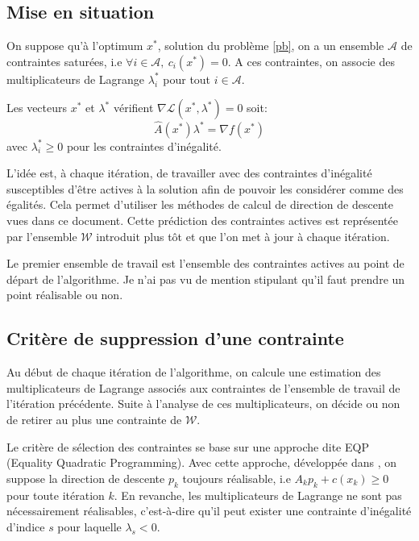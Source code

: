 \documentclass[a4paper,11pt]{article}
\newcommand{\ha}{\hat{A}}
\numberwithin{equation}{section}
\begin{document}
\subsection{Mise en situation}

On suppose qu'à l'optimum $x^{*}$, solution du problème \ref{pb}, on a 
un ensemble $\mathcal{A}$ de contraintes saturées, i.e $\forall i \in \mathcal{A},\ c_{i}(x^{*}) = 0$. A ces contraintes, on associe des multiplicateurs de Lagrange $\lambda^{*}_{i}$ pour tout $i\in \mathcal{A}$. 

Les vecteurs $x^{*}$ et $\lambda^{*}$ vérifient $\nabla \mathcal{L}(x^{*},\lambda^{*}) = 0$ soit:
\begin{equation} 
\ha(x^{*})\lambda^{*}=\nabla f(x^{*})
\end{equation}
avec $\lambda_{i}^{*}\geq0$ pour les contraintes d'inégalité. 

L'idée est, à chaque itération, de travailler avec des contraintes d'inégalité susceptibles d'être actives à la solution afin de pouvoir les considérer comme des égalités. Cela permet d'utiliser les méthodes de calcul de direction de descente vues dans ce document. Cette prédiction des contraintes actives est représentée par l'ensemble $\mathcal{W}$ introduit plus tôt et que l'on met à jour à chaque itération. 

Le premier ensemble de travail est l'ensemble des contraintes actives au point de départ de l'algorithme. Je n'ai pas vu de mention stipulant qu'il faut prendre un point réalisable ou non.
\subsection{Critère de suppression d'une contrainte} \label{criteresupr}

Au début de chaque itération de l'algorithme, on calcule une estimation des multiplicateurs de Lagrange associés aux contraintes de l'ensemble de travail de l'itération précédente. Suite à l'analyse de ces multiplicateurs, on décide ou non de retirer au plus une contrainte de $\mathcal{W}$.

Le critère de sélection des contraintes se base sur une approche dite EQP (Equality Quadratic Programming). Avec cette approche, développée dans \cite{gillmurray1985}, on suppose la direction de descente $p_{k}$ toujours réalisable, i.e $A_{k}p_{k} + c(x_{k}) \geq 0$ pour toute itération $k$. En revanche, les multiplicateurs de Lagrange ne sont pas nécessairement réalisables, c'est-à-dire qu'il peut exister une contrainte d'inégalité d'indice $s$ pour laquelle $\lambda_{s}<0$.  
\end{document}
